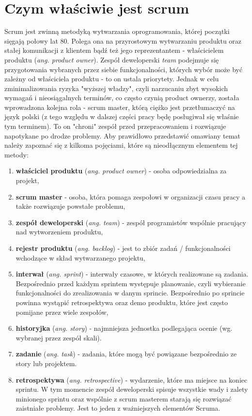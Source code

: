 \section{Czym właściwie jest scrum}
Scrum jest zwinną metodyką wytwarzania oprogramowania, której początki sięgają połowy lat 80. Polega ona na przyrostowym wytwarzaniu produktu oraz stałej komunikacji z klientem bądź też jego reprezentantem - właścicielem produktu (\textit{ang. product owner}). Zespół deweloperski {\textit{team}} podejmuje się przygotowania wybranych przez siebie funkcjonalności, których wybór może być zależny od właściciela produktu - to on ustala priorytety. Jednak w celu zminimalizowania ryzyka "wyższej władzy", czyli narzucaniu zbyt wysokich wymagań i nieosiągalnych terminów, co często czynią product ownerzy, została wprowadzona kolejna rola - scrum master, którą ciężko jest przetłumaczyć na język polski (z tego względu w dalszej części pracy będę posługiwał się właśnie tym terminem). To on "chroni" zespół przed przepracowaniem i rozwiązuje napotykane po drodze problemy. Aby prawidłowo przedstawić omawiany temat należy zapoznać się z kilkoma pojęciami, które są nieodłącznym elementem tej metody:
\begin{enumerate}
	\item \textbf{właściciel produktu} (\textit{ang. product owner}) - osoba odpowiedzialna za projekt,
	\item \textbf{scrum master} - osoba, która pomaga zespołowi w organizacji czasu pracy a także rozwiązuje powstałe problemu,
	\item \textbf{zespół deweloperski} (\textit{ang. team}) - zespół programistów wspólnie pracujący nad wytworzeniem produktu,
	\item \textbf{rejestr produktu} (\textit{ang. backlog}) - jest to zbiór zadań / funkcjonalności wchodzące w skład wytwarzanego projektu,
	\item \textbf{interwał} (\textit{ang. sprint}) - interwały czasowe, w których realizowane są zadania. Bezpośrednio przed każdym sprintem występuje planowanie, czyli wybieranie funkcjonalności do zrealizowania w danym sprincie. Bezpośrednio po sprincie powinna wystąpić retrospektywa oraz demo produktu, które jest często pomijane przez wiele zespołów,
	\item \textbf{historyjka} (\textit{ang. story}) - najmniejsza jednostka podlegająca ocenie (wg. wybranej przez zespół skali). 
	\item \textbf{zadanie} (\textit{ang. task}) - zadania, które mogą być powiązane bezpośrednio ze story lub projektem.
	\item \textbf{retrospektywa} (\textit{ang. retrospective}) - wydarzenie, które ma miejsce na koniec sprintu. W tym momencie zespół deweloperski spisuje wszystkie wady i zalety minionego sprintu oraz wspólnie z scrum masterem starają się rozwiązać zaistniałe problemy. Jest to jeden z ważniejszych elementów Scruma.
\end{enumerate} 

